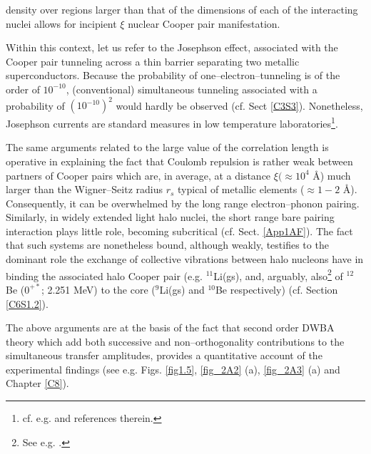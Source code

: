 density over regions larger than that of the dimensions of each of the interacting nuclei allows for incipient $\xi$ nuclear Cooper pair manifestation.



Within this context, let us refer to the Josephson effect, associated with the Cooper pair tunneling across a thin barrier separating two metallic superconductors. Because the probability of one--electron--tunneling is of the order of $10^{-10}$, (conventional) simultaneous tunneling associated with a probability of $(10^{-10})^2$ would hardly be observed (cf. Sect \ref{C3S3}). Nonetheless, Josephson currents are standard measures in low temperature laboratories\footnote{cf. e.g. \cite{Rogalla:12} and references therein.}.


The same arguments related  to the large value of the correlation length is operative in explaining the fact that Coulomb repulsion is rather weak between partners of Cooper pairs which are, in average, at a distance $\xi (\approx 10^{4}$ \AA{}) much larger than the Wigner--Seitz radius $r_s$ typical of metallic elements ($\approx 1-2$ \AA{}). Consequently, it can be overwhelmed by the long range electron--phonon pairing. Similarly, in widely extended light halo nuclei, the short range bare pairing interaction plays little role, becoming subcritical (cf. Sect. \ref{App1AF}). The fact that such systems are nonetheless bound, although weakly, testifies to the dominant role the exchange of collective vibrations between halo nucleons have in binding the associated halo Cooper pair (e.g. $^{11}$Li(gs), and, arguably, also\footnote{See e.g. \cite{Johansen:13}.} of $^{12}$Be ($0^{+*}$; 2.251 MeV) to the core ($^{9}$Li(gs) and $^{10}$Be respectively) (cf. Section \ref{C6S1.2}).


The above arguments are at the basis of the fact that second order DWBA theory which add both successive and non--orthogonality contributions to the simultaneous transfer amplitudes, provides a quantitative account of the experimental findings (see e.g. Figs. \ref{fig1.5}, \ref{fig_2A2} (a), \ref{fig_2A3} (a) and Chapter  \ref{C8}).

